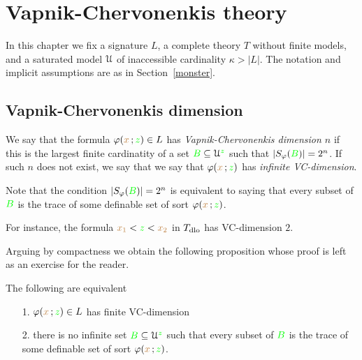 \chapter{Vapnik-Chervonenkis theory}
\label{vc}

\def\medrel#1{\parbox[t]{6ex}{$\displaystyle\hfil #1$}}
\def\ceq#1#2#3{\parbox{25ex}{$\displaystyle #1$}\medrel{#2}$\displaystyle  #3$}

In this chapter we fix a signature $L$, a complete theory $T$ without finite models, and a saturated model $\EuScript U$ of inaccessible cardinality $\kappa>|L|$.
The notation and implicit assumptions are as in Section~\ref{monster}.

\section{Vapnik-Chervonenkis dimension}
\label{VCdim}

\def\ceq#1#2#3{\parbox{25ex}{$\displaystyle #1$}\medrel{#2}$\displaystyle  #3$}

We say that the formula $\varphi({\color{brown} x}\,;{\color{green} z})\in L$ has \emph{Vapnik-Chervonenkis dimension $n$\/} if this is the largest finite cardinatity of a set ${\color{green} B}\subseteq\EuScript U^{\color{green} z}$ such that $|S_\varphi({\color{green} B})|=2^n$. If such $n$ does not exist, we say that we say that  $\varphi({\color{brown} x}\,;{\color{green} z})$ has \emph{infinite VC-dimension}. 

Note that the condition $|S_\varphi({\color{green} B})|=2^n$ is equivalent to saying that every subset of ${\color{green} B}$ is the trace of some definable set of sort $\varphi({\color{brown} x}\,;{\color{green} z})$.

For instance, the formula ${\color{brown} x_1}<{\color{green} z}<{\color{brown} x_2}$ in $T_{\rm dlo}$ has VC-dimension $2$.

Arguing by compactness we obtain the following proposition whose proof is left as an exercise for the reader.

\begin{proposition}
The following are equivalent 
\begin{itemize}
\item[1.] $\varphi({\color{brown} x}\,;{\color{green} z})\in L$ has finite VC-dimension
\item[2.] there is no infinite set ${\color{green} B}\subseteq\EuScript U^{\color{green} z}$ such that every subset of ${\color{green} B}$ is the trace of some definable set of sort $\varphi({\color{brown} x}\,;{\color{green} z})$.
\end{itemize}
\end{proposition}

